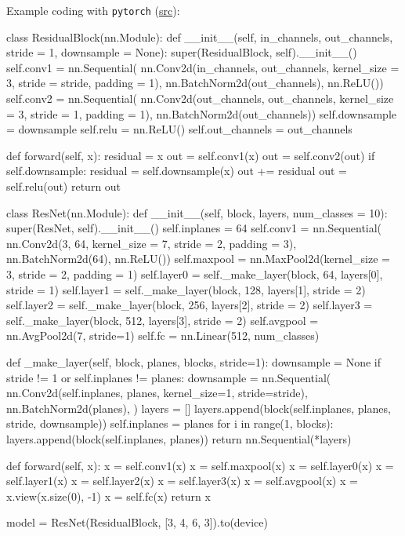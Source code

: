Example coding with \texttt{pytorch} (\href{https://blog.paperspace.com/writing-resnet-from-scratch-in-pytorch/}{src}):
\begin{python}
class ResidualBlock(nn.Module):
	def __init__(self, in_channels, out_channels,
			stride = 1, downsample = None):
		super(ResidualBlock, self).__init__()
		self.conv1 = nn.Sequential(
		nn.Conv2d(in_channels, out_channels, kernel_size = 3,
		stride = stride, padding = 1),
		nn.BatchNorm2d(out_channels),
		nn.ReLU())
		self.conv2 = nn.Sequential(
		nn.Conv2d(out_channels, out_channels, kernel_size = 3,
		stride = 1, padding = 1),
		nn.BatchNorm2d(out_channels))
		self.downsample = downsample
		self.relu = nn.ReLU()
		self.out_channels = out_channels
	
	def forward(self, x):
		residual = x
		out = self.conv1(x)
		out = self.conv2(out)
		if self.downsample:
			residual = self.downsample(x)
		out += residual
		out = self.relu(out)
		return out
\end{python}

\begin{python}
class ResNet(nn.Module):
	def __init__(self, block, layers, num_classes = 10):
		super(ResNet, self).__init__()
		self.inplanes = 64
		self.conv1 = nn.Sequential(
		nn.Conv2d(3, 64, kernel_size = 7, stride = 2, padding = 3),
		nn.BatchNorm2d(64),
		nn.ReLU())
		self.maxpool = nn.MaxPool2d(kernel_size = 3, stride = 2, padding = 1)
		self.layer0 = self._make_layer(block, 64, layers[0], stride = 1)
		self.layer1 = self._make_layer(block, 128, layers[1], stride = 2)
		self.layer2 = self._make_layer(block, 256, layers[2], stride = 2)
		self.layer3 = self._make_layer(block, 512, layers[3], stride = 2)
		self.avgpool = nn.AvgPool2d(7, stride=1)
		self.fc = nn.Linear(512, num_classes)
		
	def _make_layer(self, block, planes, blocks, stride=1):
		downsample = None
		if stride != 1 or self.inplanes != planes:
			downsample = nn.Sequential(
				nn.Conv2d(self.inplanes, planes, kernel_size=1, stride=stride),
				nn.BatchNorm2d(planes),
				)
		layers = []
		layers.append(block(self.inplanes, planes, stride, downsample))
		self.inplanes = planes
		for i in range(1, blocks):
			layers.append(block(self.inplanes, planes))
		return nn.Sequential(*layers)
	
	def forward(self, x):
		x = self.conv1(x)
		x = self.maxpool(x)
		x = self.layer0(x)
		x = self.layer1(x)
		x = self.layer2(x)
		x = self.layer3(x)
		x = self.avgpool(x)
		x = x.view(x.size(0), -1)
		x = self.fc(x)
		return x
	
model = ResNet(ResidualBlock, [3, 4, 6, 3]).to(device)
\end{python}

